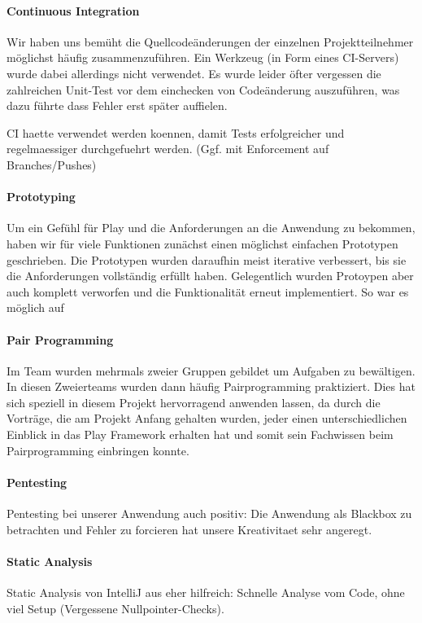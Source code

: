 \documentclass[12pt,DIV14,BCOR10mm,a4paper,parskip=half-,headsepline,headinclude,english,ngerman,bibliography=totocnumbered]{scrreprt}
\begin{document}
\paragraph{Continuous Integration}
Wir haben uns bemüht die Quellcodeänderungen der einzelnen Projektteilnehmer möglichst häufig zusammenzuführen. Ein Werkzeug (in Form eines CI-Servers) wurde dabei allerdings nicht verwendet. Es wurde leider öfter vergessen die zahlreichen Unit-Test vor dem einchecken von Codeänderung auszuführen, was dazu führte dass Fehler erst später auffielen.

 
CI haette verwendet werden koennen, damit Tests erfolgreicher und regelmaessiger durchgefuehrt werden. (Ggf. mit Enforcement auf Branches/Pushes)

\paragraph{Prototyping}
Um ein Gefühl für Play und die Anforderungen an die Anwendung zu bekommen, haben wir für viele Funktionen zunächst einen möglichst einfachen Prototypen geschrieben. Die Prototypen wurden daraufhin meist iterative verbessert, bis sie die Anforderungen vollständig erfüllt haben. Gelegentlich wurden Protoypen aber auch komplett verworfen und die Funktionalität erneut implementiert. So war es möglich auf 


\paragraph{Pair Programming} Im Team wurden mehrmals zweier Gruppen gebildet um Aufgaben zu bewältigen. In diesen Zweierteams wurden dann häufig Pairprogramming praktiziert. Dies hat sich speziell in diesem Projekt hervorragend anwenden lassen, da durch die Vorträge, die am Projekt Anfang gehalten wurden, jeder einen unterschiedlichen Einblick in das Play Framework erhalten hat und somit sein Fachwissen beim Pairprogramming einbringen konnte.


\paragraph{Pentesting}
Pentesting bei unserer Anwendung auch positiv: Die Anwendung als Blackbox zu betrachten und Fehler zu forcieren hat unsere Kreativitaet sehr angeregt.

\paragraph{Static Analysis}
Static Analysis von IntelliJ aus eher hilfreich: Schnelle Analyse vom Code, ohne viel Setup (Vergessene Nullpointer-Checks).
\end{document}
